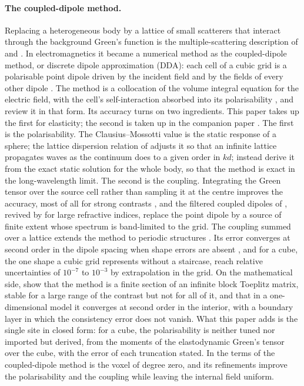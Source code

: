\documentclass[11pt,a4paper]{article}
\begin{document}
\paragraph{The coupled-dipole method.} Replacing a heterogeneous body by a lattice of small
scatterers that interact through the background Green's function is the multiple-scattering
description of \citet{Foldy1945} and \citet{Lax1951}. In electromagnetics it became a numerical
method as the coupled-dipole method, or discrete dipole approximation (DDA): each cell of a cubic
grid is a polarisable point dipole driven by the incident field and by the fields of every other
dipole \citep{Purcell1973,Draine1994}. The method is a collocation of the volume integral equation
for the electric field, with the cell's self-interaction absorbed into its polarisability
\citep{Lakhtakia1992}, and \citet{YurkinHoekstra2007} review it in that form. Its accuracy turns on
two ingredients. This paper takes up the first for elasticity; the second is taken up in the companion
paper \citep{NestorError2026}. The first is the polarisability. The
Clausius--Mossotti value is the static response of a sphere; the lattice dispersion relation of
\citet{Draine1993} adjusts it so that an infinite lattice propagates waves as the continuum does to
a given order in $kd$; \citet{Rahmani2002} instead derive it from the exact static solution for the
whole body, so that the method is exact in the long-wavelength limit. The second is the coupling.
Integrating the Green tensor over the source cell rather than sampling it at the centre improves the
accuracy, most of all for strong contrasts \citep{Chaumet2004}, and the filtered coupled dipoles of
\citet{Piller1998}, revived by \citet{Yurkin2010} for large refractive indices, replace the point
dipole by a source of finite extent whose spectrum is band-limited to the grid. The coupling summed
over a lattice extends the method to periodic structures \citep{Chaumet2003}. Its error converges
at second order in the dipole spacing when shape errors are absent \citep{Yurkin2006}, and for a
cube, the one shape a cubic grid represents without a staircase, \citet{YurkinKahnert2013} reach
relative uncertainties of $10^{-7}$ to $10^{-3}$ by extrapolation in the grid. On the mathematical
side, \citet{Costabel2023} show that the method is a finite section of an infinite block Toeplitz
matrix, stable for a large range of the contrast but not for all of it, and \citet{Costabel2023Hilbert}
that in a one-dimensional model it converges at second order in the interior, with a boundary layer in
which the consistency error does not vanish. What this paper adds is the single site in closed form:
for a cube, the polarisability is neither tuned nor imported but derived, from the moments of the
elastodynamic Green's tensor over the cube, with the error of each truncation stated. In the terms of
\citet{NestorError2026} the coupled-dipole method is the voxel of degree zero, and its refinements
improve the polarisability and the coupling while leaving the internal field uniform.
\end{document}
